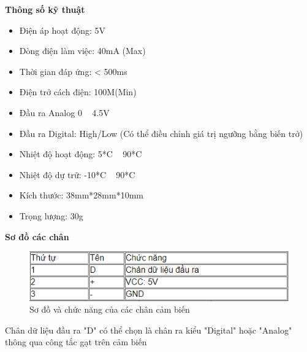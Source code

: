 \indent \textbf{Thông số kỹ thuật}
\begin{itemize}
	\item Điện áp hoạt động: 5V
	\item Dòng điện làm việc: 40mA (Max)
	\item Thời gian đáp ứng: < 500ms
	\item Điện trở cách điện: 100M(Min)
	\item Đầu ra Analog 0 ~ 4.5V
	\item Đầu ra Digital: High/Low (Có thể điều chỉnh giá trị ngưỡng bằng biến trở)
	\item Nhiệt độ hoạt động: 5*C ~ 90*C
	\item Nhiệt độ dự trữ: -10*C ~ 90*C
	\item Kích thước: 38mm*28mm*10mm
	\item Trọng lượng: 30g
\end{itemize}

\indent \textbf{Sơ đồ các chân}
\begin{figure}[H]
	\centering
	\includegraphics[scale=1]{Chapter 3/image chapter 3/sodoTurbi.PNG}
	\caption[Sơ đồ và chức năng của các chân cảm biến]{Sơ đồ và chức năng của các chân cảm biến}
\end{figure}
\indent Chân dữ liệu đầu ra "D" có thể chọn là chân ra kiểu "Digital" hoặc "Analog" thông qua công tắc gạt trên cảm biến
